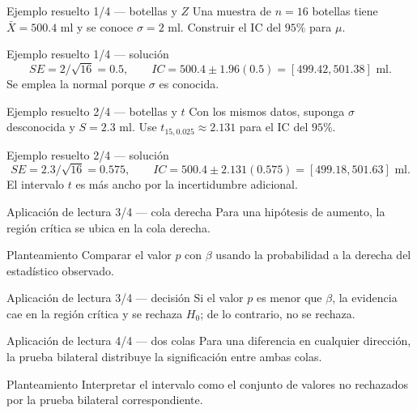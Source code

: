 \documentclass[10pt,aspectratio=169]{beamer}
\begin{document}
\begin{frame}{Ejemplo resuelto 1/4 --- botellas y $Z$}
  \footnotesize
  Una muestra de $n=16$ botellas tiene $\bar X=500.4$ ml y se conoce
  $\sigma=2$ ml. Construir el IC del $95\%$ para $\mu$.
\end{frame}

\begin{frame}{Ejemplo resuelto 1/4 --- solución}
  \footnotesize
  \[
    SE=2/\sqrt{16}=0.5,\qquad
    IC=500.4\pm1.96(0.5)=[499.42,501.38]\text{ ml}.
  \]
  Se emplea la normal porque $\sigma$ es conocida.
\end{frame}

\begin{frame}{Ejemplo resuelto 2/4 --- botellas y $t$}
  \footnotesize
  Con los mismos datos, suponga $\sigma$ desconocida y $S=2.3$ ml. Use
  $t_{15,0.025}\approx2.131$ para el IC del $95\%$.
\end{frame}

\begin{frame}{Ejemplo resuelto 2/4 --- solución}
  \footnotesize
  \[
    SE=2.3/\sqrt{16}=0.575,\qquad
    IC=500.4\pm2.131(0.575)=[499.18,501.63]\text{ ml}.
  \]
  El intervalo $t$ es más ancho por la incertidumbre adicional.
\end{frame}

\begin{frame}{Aplicación de lectura 3/4 --- cola derecha}
  \footnotesize
  Para una hipótesis de aumento, la región crítica se ubica en la cola derecha.
  \begin{block}{Planteamiento}
    Comparar el valor $p$ con $\beta$ usando la probabilidad a la derecha del
    estadístico observado.
  \end{block}
\end{frame}

\begin{frame}{Aplicación de lectura 3/4 --- decisión}
  \footnotesize
  Si el valor $p$ es menor que $\beta$, la evidencia cae en la región crítica y
  se rechaza $H_0$; de lo contrario, no se rechaza.
\end{frame}

\begin{frame}{Aplicación de lectura 4/4 --- dos colas}
  \footnotesize
  Para una diferencia en cualquier dirección, la prueba bilateral distribuye la
  significación entre ambas colas.
  \begin{block}{Planteamiento}
    Interpretar el intervalo como el conjunto de valores no rechazados por la
    prueba bilateral correspondiente.
  \end{block}
\end{frame}
\end{document}
